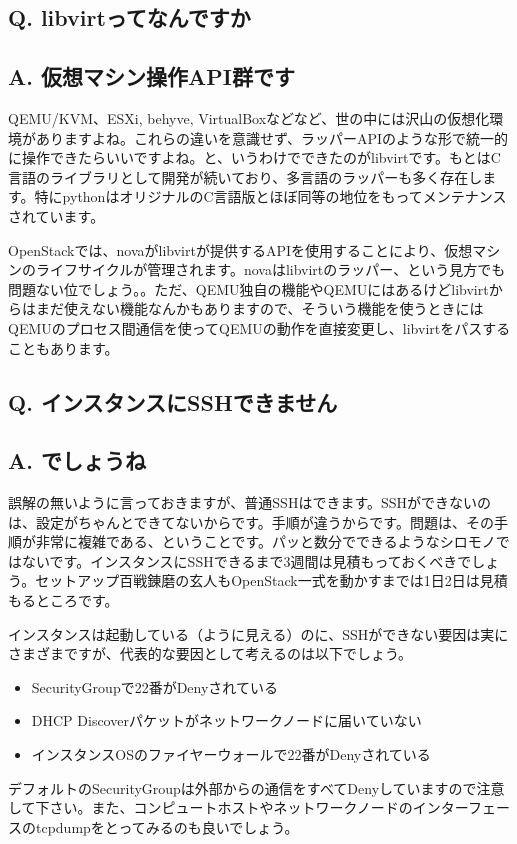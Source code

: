\documentclass[9pt,b5paper,tombo,openany]{jsbook}
\begin{document}
\subsection*{{\LARGE\bfseries Q.} libvirtってなんですか}
\subsection*{{\LARGE\bfseries A.} 仮想マシン操作API群です}
QEMU/KVM、ESXi, behyve, VirtualBoxなどなど、世の中には沢山の仮想化環境がありますよね。これらの違いを意識せず、ラッパーAPIのような形で統一的に操作できたらいいですよね。と、いうわけでできたのがlibvirtです。もとはC言語のライブラリとして開発が続いており、多言語のラッパーも多く存在します。特にpythonはオリジナルのC言語版とほぼ同等の地位をもってメンテナンスされています。

OpenStackでは、novaがlibvirtが提供するAPIを使用することにより、仮想マシンのライフサイクルが管理されます。novaはlibvirtのラッパー、という見方でも問題ない位でしょう。。ただ、QEMU独自の機能やQEMUにはあるけどlibvirtからはまだ使えない機能なんかもありますので、そういう機能を使うときにはQEMUのプロセス間通信を使ってQEMUの動作を直接変更し、libvirtをパスすることもあります。

\subsection*{{\LARGE\bfseries Q.} インスタンスにSSHできません}
\subsection*{{\LARGE\bfseries A.} でしょうね}
誤解の無いように言っておきますが、普通SSHはできます。SSHができないのは、設定がちゃんとできてないからです。手順が違うからです。問題は、その手順が非常に複雑である、ということです。パッと数分でできるようなシロモノではないです。インスタンスにSSHできるまで3週間は見積もっておくべきでしょう。セットアップ百戦錬磨の玄人もOpenStack一式を動かすまでは1日2日は見積もるところです。

インスタンスは起動している（ように見える）のに、SSHができない要因は実にさまざまですが、代表的な要因として考えるのは以下でしょう。
\begin{itemize}
	\item SecurityGroupで22番がDenyされている
	\item DHCP Discoverパケットがネットワークノードに届いていない
	\item インスタンスOSのファイヤーウォールで22番がDenyされている
\end{itemize}
デフォルトのSecurityGroupは外部からの通信をすべてDenyしていますので注意して下さい。また、コンピュートホストやネットワークノードのインターフェースのtcpdumpをとってみるのも良いでしょう。
\end{document}
